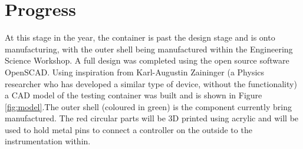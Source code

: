 \documentclass[a4paper,11pt]{article}
\begin{document}
\section{Progress}\label{fig:subim1}At this stage in the year, the container is past the design stage and is onto manufacturing, with the outer shell being manufactured within the Engineering Science Workshop. A full design was completed using the open source software OpenSCAD. Using inspiration from Karl-Augustin Zaininger (a Physics researcher who has developed a similar type of device, without the functionality) a CAD model of the testing container was built and is shown in Figure \ref{fig:model}.The outer shell (coloured in green) is the component currently bring manufactured. The red circular parts will be 3D printed using acrylic and will be used to hold metal pins to connect a controller on the outside to the instrumentation within. 
\end{document}

